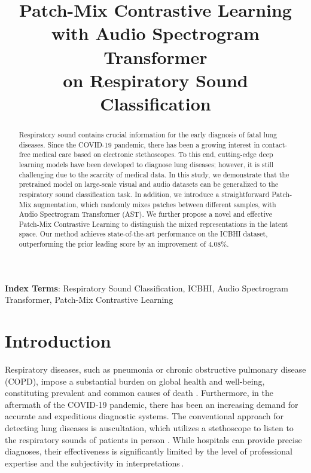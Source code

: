 \documentclass{INTERSPEECH2023}
\title{Patch-Mix Contrastive Learning with Audio Spectrogram Transformer\\on Respiratory Sound Classification}
\begin{document}
\maketitle

\begin{abstract}

Respiratory sound contains crucial information for the early diagnosis of fatal lung diseases. Since the COVID-19 pandemic, there has been a growing interest in contact-free medical care based on electronic stethoscopes. To this end, cutting-edge deep learning models have been developed to diagnose lung diseases; however, it is still challenging due to the scarcity of medical data. In this study, we demonstrate that the pretrained model on large-scale visual and audio datasets can be generalized to the respiratory sound classification task. In addition, we introduce a straightforward Patch-Mix augmentation, which randomly mixes patches between different samples, with Audio Spectrogram Transformer (AST). We further propose a novel and effective Patch-Mix Contrastive Learning to distinguish the mixed representations in the latent space. Our method achieves state-of-the-art performance on the ICBHI dataset, outperforming the prior leading score by an improvement of 4.08\%.
\end{abstract} 

\noindent\textbf{Index Terms}: Respiratory Sound Classification, ICBHI, Audio Spectrogram Transformer, Patch-Mix Contrastive Learning

 

\section{Introduction}



Respiratory diseases, such as pneumonia or chronic obstructive pulmonary disease (COPD), impose a substantial burden on global health and well-being, constituting prevalent and common causes of death \cite{FIRS2021}. 
Furthermore, in the aftermath of the COVID-19 pandemic, there has been an increasing demand for accurate and expeditious diagnostic systems.
The conventional approach for detecting lung diseases is auscultation, which utilizes a stethoscope to listen to the respiratory sounds of patients in person \cite{arabi2021covid}. While hospitals can provide precise diagnoses, their effectiveness is significantly limited by the level of professional expertise and the subjectivity in interpretations\,\cite{sarkar2015auscultation, arts2020diagnostic}.
\end{document}
